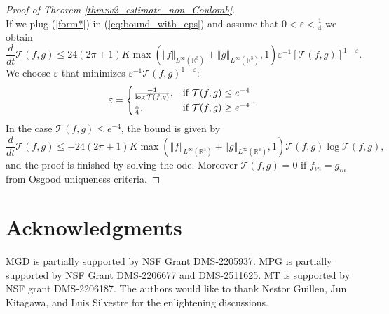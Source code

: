 \documentclass[11pt]{amsart}
\numberwithin{equation}{section}
\begin{document}
\begin{proof}[Proof of Theorem \ref{thm:w2_estimate_non_Coulomb}]
\begin{equation}
\end{equation}
%
If we plug (\ref{form*}) in (\ref{eq:bound_with_eps})  and assume that $0<\varepsilon<\frac{1}{4}$ we obtain
%
\begin{equation*}
  \frac{d}{dt} \mathcal T(f,g)\leq 24(2\pi+1)K\max\left(\left\Vert f\right\Vert _{L^{\infty}(\mathbb{R}^{3})}+\left\Vert g\right\Vert _{L^{\infty}(\mathbb{R}^{3})},1\right)\varepsilon^{-1}\left[\mathcal T(f,g)\right]^{1-\varepsilon}.
\end{equation*}
%
We choose $\varepsilon$ that minimizes $\varepsilon^{-1}\mathcal T(f,g)^{1-\varepsilon}$: 
\begin{equation*}
  \varepsilon=
  \begin{cases}
    \frac{-1}{\log \mathcal T(f,g)}, & \textnormal{if } \mathcal T(f,g)\leq e^{-4}\\
    \frac{1}{4}, & \textnormal{if } \mathcal T(f,g)\geq e^{-4}
    \end{cases}.
\end{equation*}
%
In the case $\mathcal T(f,g)\leq e^{-4}$, the bound is given by
%
\begin{equation*}
  \frac{d}{dt}\mathcal T(f,g)\leq-24(2\pi+1)K\max\left(\left\Vert f\right\Vert _{L^{\infty}(\mathbb{R}^{3})}+\left\Vert g\right\Vert _{L^{\infty}(\mathbb{R}^{3})},1\right)\mathcal T(f,g)\log \mathcal T(f,g),
\end{equation*}
and the proof is finished by solving the ode. %
Moreover $\mathcal T(f,g)=0$ if $f_{in} = g_{in}$ from Osgood uniqueness criteria.
%
\end{proof}


\section*{Acknowledgments}
MGD is partially supported by NSF Grant  DMS-2205937. MPG is partially supported by NSF Grant DMS-2206677 and DMS-2511625. MT is supported by NSF grant
DMS-2206187.  The authors would like to thank Nestor Guillen, Jun Kitagawa, and Luis Silvestre for the enlightening discussions.%
  
  
\end{document}
